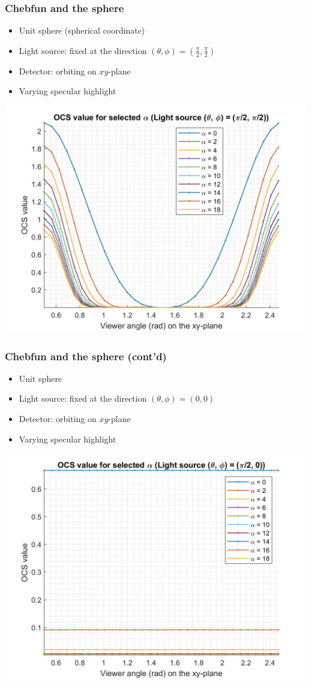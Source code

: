 \documentclass{beamer}
\begin{document}
\begin{frame}[t]
\frametitle{Chebfun and the sphere}
\begin{itemize}
\item Unit sphere (spherical coordinate)
\item Light source: fixed at the direction $(\theta,\phi) = (\frac{\pi}{2},\frac{\pi}{2})$
\item Detector: orbiting on $xy$-plane
\item Varying specular highlight
\end{itemize}

\centering \includegraphics[scale=0.13]{./figs/OCS_parallel_plane}
\end{frame}

\begin{frame}[t]
\frametitle{Chebfun and the sphere (cont'd)}
\begin{itemize}
\item Unit sphere
\item Light source: fixed at the direction $(\theta,\phi) = (0,0)$
\item Detector: orbiting on $xy$-plane
\item Varying specular highlight
\end{itemize}

\centering \includegraphics[scale=0.13]{./figs/OCS_perpendicular_plane}
\end{frame}
\end{document}
